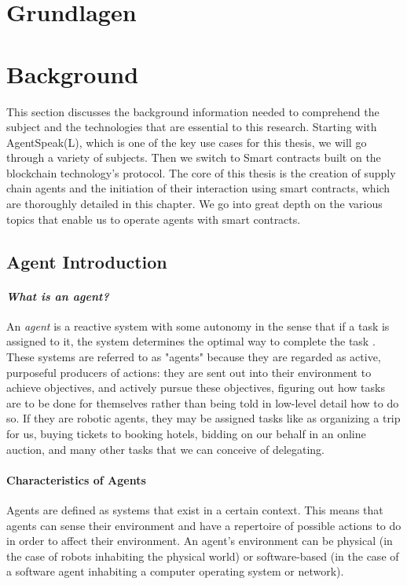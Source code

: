 {\chapter{Grundlagen}}
{\chapter{Background}}
\label{sec:background}


This section discusses the background information needed to comprehend the subject and the technologies that are essential to this research. Starting with AgentSpeak(L), which is one of the key use cases for this thesis, we will go through a variety of subjects. Then we switch to Smart contracts built on the blockchain technology's protocol. The core of this thesis is the creation of supply chain agents and the initiation of their interaction using smart contracts, which are thoroughly detailed in this chapter. We go into great depth on the various topics that enable us to operate agents with smart contracts. 

\section{Agent Introduction}

\subsubsection{\textit{What is an agent?}}
An \textit{agent} is a reactive system with some autonomy in the sense that if a task is assigned to it, the system determines the optimal way to complete the task \cite{defagent}. These systems are referred to as "agents" because they are regarded as active, purposeful producers of actions: they are sent out into their environment to achieve objectives, and actively pursue these objectives, figuring out how tasks are to be done for themselves rather than being told in low-level detail how to do so. If they are robotic agents, they may be assigned tasks like as organizing a trip for us, buying tickets to booking hotels, bidding on our behalf in an online auction, and many other tasks that we can conceive of delegating.


\subsubsection{Characteristics of Agents}

Agents are defined as systems that exist in a certain context. This means that agents can sense their environment and have a repertoire of possible actions to do in order to affect their environment. An agent's environment can be physical (in the case of robots inhabiting the physical world) or software-based (in the case of a software agent inhabiting a computer operating system or network).

